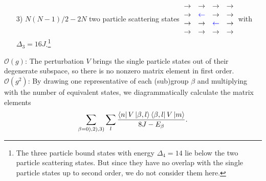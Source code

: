 \begin{enumerate}
	\item[3)] $N(N-1)/2 - 2N$ two particle scattering states $\: \begin{matrix} \rightarrow & \rightarrow & \rightarrow & \rightarrow \\ \rightarrow & \textcolor{blue}{\leftarrow} & \rightarrow & \rightarrow \\ \rightarrow & \rightarrow & \textcolor{blue}{\leftarrow} & \rightarrow \\ \rightarrow & \rightarrow & \rightarrow & \rightarrow \\ \end{matrix} \:$ with $\Delta_3 = 16J$.\footnote{The three particle bound states with energy $\Delta_4 = 14$ lie below the two particle scattering states. But since they have no overlap with the single particle states up to second order, we do not consider them here.}
\end{enumerate}
\noindent $\mathcal{O}(g)$: The perturbation $V$ brings the single particle states out of their degenerate subspace, so there is no nonzero matrix element in first order. \\

\noindent $\mathcal{O}(g^2)$: By drawing one representative of each (sub)group $\beta$ and multiplying with the number of equivalent states, we diagrammatically calculate the matrix elements 
\begin{equation}
\sum_{\beta=0),2),3)} \sum_{l} \frac{\bra{n} V \ket{\beta, l} \bra{\beta, l} V \ket{m}}{8J - E_{\beta}}.
\end{equation}

